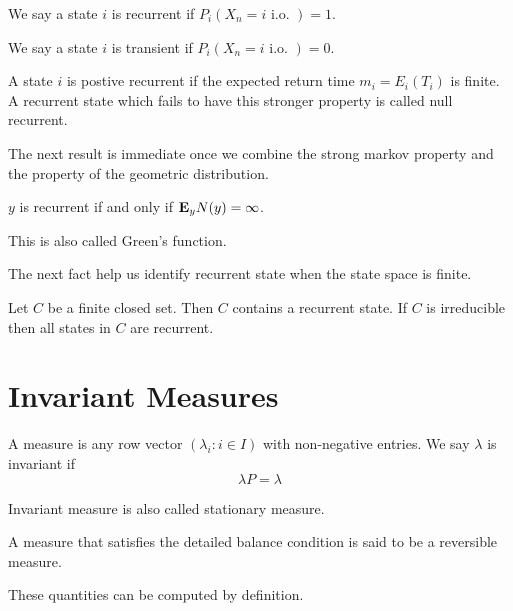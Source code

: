 \begin{definition}[recurrent]
    We say a state $i$ is recurrent if $P_i(X_n=i\text{ i.o. })=1$.
\end{definition}
\begin{definition}[transient]
    We say a state $i$ is transient if $P_i(X_n=i\text{ i.o. })=0$.
\end{definition}
\begin{definition}
    A state $i$ is postive recurrent if the expected return time $m_i=E_i(T_i)$ is finite.
    A recurrent state which fails to have this stronger property is called null recurrent.
\end{definition}
The next result is immediate once we combine the strong markov property and the property of the geometric distribution.
\begin{theorem}
    $y$ is recurrent if and only if $\mathbf{E}_yN(y)=\infty$.
\end{theorem}
This is also called Green's function.

The next fact help us identify recurrent state when the state space is finite.
\begin{theorem}
    Let $C$ be a finite closed set. Then $C$ contains a recurrent state. If $C$ is irreducible then all states in $C$ are recurrent.
\end{theorem}

\begin{theorem}
    
\end{theorem}

\section{Invariant Measures}

\begin{definition}
    A measure is any row vector $(\lambda_i:i\in I)$ with non-negative entries. We say $\lambda$ is invariant if \[\lambda P=\lambda\]
\end{definition}
\begin{remark}
    Invariant measure is also called stationary measure.
\end{remark}

\begin{definition}
    
\end{definition}
\begin{definition}
    A measure that satisfies the detailed balance condition is said to be a reversible measure.
\end{definition}
These quantities can be computed by definition.

